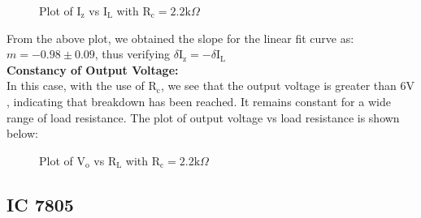 \documentclass{scrartcl}
\begin{document}
        \noindent
\begin{figure}[H]
        \centering
        
        \caption{Plot of $\mathrm{I_z}$ vs $\mathrm{I_L}$ with $\mathrm{R_c} = 2.2 \mathrm{k}\Omega$}
\end{figure}
\noindent
From the above plot, we obtained the slope for the linear fit curve as: ${m = -0.98\pm0.09}$, thus verifying  $\delta\mathrm{I_z} = - \delta\mathrm{I_L}$ \\[0.3cm]
\textbf{Constancy of Output Voltage:}\\[0.3cm]
In this case, with the use of $\mathrm{R_c}$, we see that the output voltage is greater than $6 \mathrm{V}$, indicating that breakdown has been reached. It remains constant for a wide range of load resistance. The plot of output voltage vs load resistance is shown below:
\begin{figure}[H]
        \centering
        
        \caption{Plot of $\mathrm{V_o}$ vs $\mathrm{R_L}$ with $\mathrm{R_c} = 2.2 \mathrm{k}\Omega$}
\end{figure}
\subsection{IC 7805}
\end{document}
